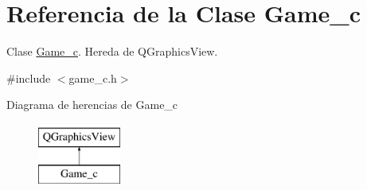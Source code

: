 \hypertarget{classGame__c}{\section{Referencia de la Clase Game\-\_\-c}
\label{classGame__c}
}


Clase \hyperlink{classGame__c}{Game\-\_\-c}. Hereda de Q\-Graphics\-View.  




{\ttfamily \#include $<$game\-\_\-c.\-h$>$}

Diagrama de herencias de Game\-\_\-c\begin{figure}[H]
\begin{center}
\leavevmode
\includegraphics[height=2.000000cm]{classGame__c}
\end{center}
\end{figure}
